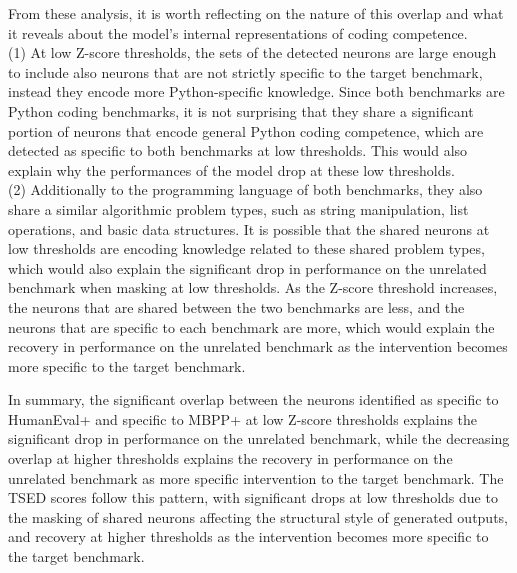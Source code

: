 \documentclass[mscthesis]{usiinfthesis}
\begin{document}
\par\vspace{1em}
From these analysis, it is worth reflecting on the nature of this overlap and what
it reveals about the model's internal representations of coding competence.\\
(1) At low Z-score thresholds, the sets of the detected neurons are large enough to include also neurons that are not strictly specific to the target benchmark, instead they encode more Python-specific knowledge.
Since both benchmarks are Python coding benchmarks, it is not surprising that they share a significant portion of neurons that encode general Python coding competence, which are detected as specific to both benchmarks at low thresholds.
This would also explain why the performances of the model drop at these low thresholds.\\
(2) Additionally to the programming language of both benchmarks, they also
share a similar algorithmic problem types, such as string manipulation, list operations, and basic data structures.
It is possible that the shared neurons at low thresholds are encoding knowledge related to these shared problem types, which would also explain the significant drop in performance on the unrelated benchmark when masking at low thresholds.
As the Z-score threshold increases, the neurons that are shared between the two benchmarks are less, and the neurons that are specific to each benchmark are more, which would explain the recovery in performance on the unrelated benchmark as the intervention becomes more specific to the target benchmark.
\par\vspace{1em}
In summary, the significant overlap between the neurons identified as specific to HumanEval+ and specific to MBPP+ at low Z-score thresholds explains the significant drop in performance on the unrelated benchmark, while the decreasing overlap at higher thresholds explains the recovery in performance on the unrelated benchmark as more specific intervention to the target benchmark.
The TSED scores follow this pattern, with significant drops at low thresholds due to the masking of shared neurons affecting the structural style of generated outputs, and recovery at higher thresholds as the intervention becomes more specific to the target benchmark.
\end{document}

